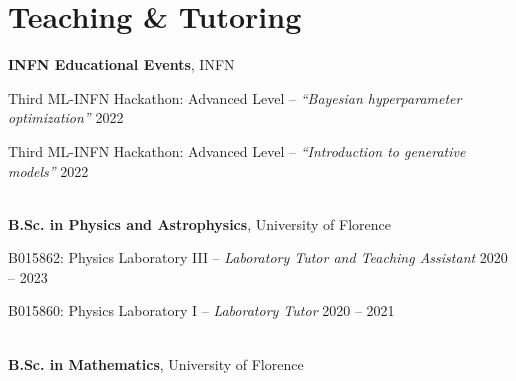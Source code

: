 \newcommand{\teaching}[2]
  {\normalsize \textbf{\color{hlcolor-0} #1}, {\color{hlcolor-1} #2}}
  
\newcommand{\teachclass}[3]
  {{\normalsize \color{maincolor} #1 --}
  {\small \color{maincolor} \emph{#2}} \hfill 
  {\normalsize \color{hlcolor-2} #3}}


\section*{Teaching \& Tutoring}
\begin{cvcontent}
  \teaching{INFN Educational Events}{INFN}
  \\ [1mm]
  \begin{itemize*}[label=\textcolor{iconcolor}{\textbullet}]
    \item \teachclass{Third ML-INFN Hackathon: Advanced Level}
      {``Bayesian hyperparameter optimization''}{2022}\\ [0.5mm]
    \item \teachclass{Third ML-INFN Hackathon: Advanced Level}
      {``Introduction to generative models''}{2022}
  \end{itemize*}
  \\ [4mm]
  \teaching{B.Sc. in Physics and Astrophysics}{University of Florence}
  \\ [1mm]
  \begin{itemize*}[label=\textcolor{iconcolor}{\textbullet}]
    \item \teachclass{B015862: Physics Laboratory III}
      {Laboratory Tutor and Teaching Assistant}{2020 -- 2023}\\ [0.5mm]
    \item \teachclass{B015860: Physics Laboratory I}
      {Laboratory Tutor}{2020 -- 2021}
  \end{itemize*}
  \\ [4mm]
  \teaching{B.Sc. in Mathematics}{University of Florence}
  \\ [1mm]
\end{cvcontent}
